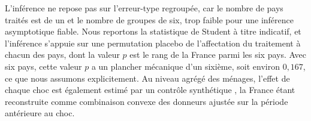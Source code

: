 L'inférence ne repose pas sur l'erreur-type regroupée, car le nombre de pays traités est de un et le
nombre de groupes de six, trop faible pour une inférence asymptotique fiable. Nous reportons la
statistique de Student à titre indicatif, et l'inférence s'appuie sur une permutation placebo de
l'affectation du traitement à chacun des pays, dont la valeur $p$ est le rang de la France parmi les
six pays. Avec six pays, cette valeur $p$ a un plancher mécanique d'un sixième, soit environ
$0{,}167$, ce que nous assumons explicitement. Au niveau agrégé des ménages, l'effet de chaque choc
est également estimé par un contrôle synthétique \citep{abadie2010,abadie2015}, la France étant
reconstruite comme combinaison convexe des donneurs ajustée sur la période antérieure au choc.
